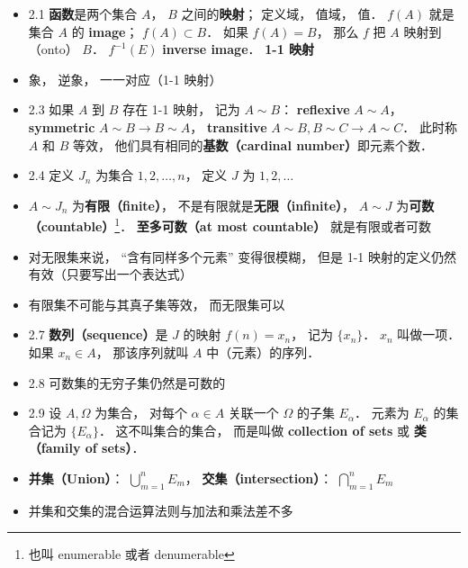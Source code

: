 \begin{itemize}
\item 2.1 \textbf{函数}是两个集合 $A$， $B$ 之间的\textbf{映射}； 定义域， 值域， 值． $f(A)$ 就是集合 $A$ 的 \textbf{image}； $f(A) \subset B$． 如果 $f(A) = B$， 那么 $f$ 把 $A$ 映射到（onto） $B$． $f^{-1}(E)$ \textbf{inverse image}． \textbf{1-1 映射}

\item 象， 逆象， 一一对应（1-1 映射）

\item 2.3 如果 $A$ 到 $B$ 存在 1-1 映射， 记为 $A \sim B$： \textbf{reflexive} $A \sim A$， \textbf{symmetric} $A \sim B \to B \sim A$， \textbf{transitive} $A \sim B, B \sim C \to A \sim C$． 此时称 $A$ 和 $B$ 等效， 他们具有相同的\textbf{基数（cardinal number）}即元素个数．

\item 2.4 定义 $J_n$ 为集合 $1,2,\dots, n$， 定义 $J$ 为 $1, 2, \dots$

\item $A \sim J_n$ 为\textbf{有限（finite）}， 不是有限就是\textbf{无限（infinite）}， $A \sim J$ 为\textbf{可数（countable）}\footnote{也叫 enumerable 或者 denumerable}． \textbf{至多可数（at most countable）} 就是有限或者可数

\item 对无限集来说， “含有同样多个元素” 变得很模糊， 但是 1-1 映射的定义仍然有效（只要写出一个表达式）

\item 有限集不可能与其真子集等效， 而无限集可以

\item 2.7 \textbf{数列（sequence）}是 $J$ 的映射 $f(n) = x_n$， 记为 $\{x_n\}$． $x_n$ 叫做一项． 如果 $x_n \in A$， 那该序列就叫 $A$ 中（元素）的序列．

\item 2.8 可数集的无穷子集仍然是可数的

\item 2.9 设 $A,\Omega$ 为集合， 对每个 $\alpha\in A$ 关联一个 $\Omega$ 的子集 $E_\alpha$． 元素为 $E_\alpha$ 的集合记为 $\{E_\alpha\}$． 这不叫集合的集合， 而是叫做 \textbf{collection of sets} 或 \textbf{类（family of sets）}．

\item \textbf{并集（Union）}： $\bigcup\limits_{m = 1}^n E_m$， \textbf{交集（intersection）}： $\bigcap\limits_{m = 1}^n E_m$

\item 并集和交集的混合运算法则与加法和乘法差不多


\end{itemize}
